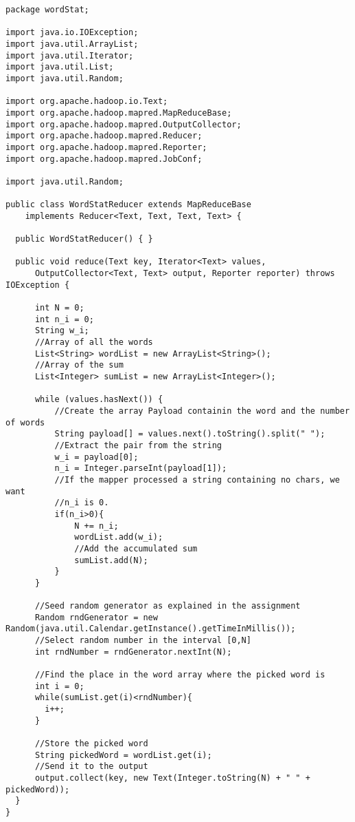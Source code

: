 \documentclass[10pt, a4paper]{article}
\begin{document}
\begin{lstlisting}
package wordStat;

import java.io.IOException;
import java.util.ArrayList;
import java.util.Iterator;
import java.util.List;
import java.util.Random;

import org.apache.hadoop.io.Text;
import org.apache.hadoop.mapred.MapReduceBase;
import org.apache.hadoop.mapred.OutputCollector;
import org.apache.hadoop.mapred.Reducer;
import org.apache.hadoop.mapred.Reporter;
import org.apache.hadoop.mapred.JobConf;

import java.util.Random;

public class WordStatReducer extends MapReduceBase
    implements Reducer<Text, Text, Text, Text> {

  public WordStatReducer() { }

  public void reduce(Text key, Iterator<Text> values,
      OutputCollector<Text, Text> output, Reporter reporter) throws IOException {
	  
	  int N = 0;
	  int n_i = 0;
	  String w_i;
	  //Array of all the words
	  List<String> wordList = new ArrayList<String>();
	  //Array of the sum 
	  List<Integer> sumList = new ArrayList<Integer>(); 
	  
	  while (values.hasNext()) {
		  //Create the array Payload containin the word and the number of words
		  String payload[] = values.next().toString().split(" ");
		  //Extract the pair from the string
		  w_i = payload[0];
		  n_i = Integer.parseInt(payload[1]);  
		  //If the mapper processed a string containing no chars, we want
		  //n_i is 0. 
		  if(n_i>0){
			  N += n_i;
			  wordList.add(w_i);
			  //Add the accumulated sum
			  sumList.add(N);
		  }
	  }

	  //Seed random generator as explained in the assignment
	  Random rndGenerator = new Random(java.util.Calendar.getInstance().getTimeInMillis()); 
	  //Select random number in the interval [0,N] 
	  int rndNumber = rndGenerator.nextInt(N);
	  
	  //Find the place in the word array where the picked word is
	  int i = 0;
	  while(sumList.get(i)<rndNumber){
		i++;    
	  }
	  
	  //Store the picked word
	  String pickedWord = wordList.get(i);
	  //Send it to the output
	  output.collect(key, new Text(Integer.toString(N) + " " + pickedWord));  
  }
}  
\end{lstlisting}

\end{document}
